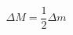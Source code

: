\begin{equation}                              
\Delta M = \frac{1}{2} \Delta m                              
\end{equation} 
